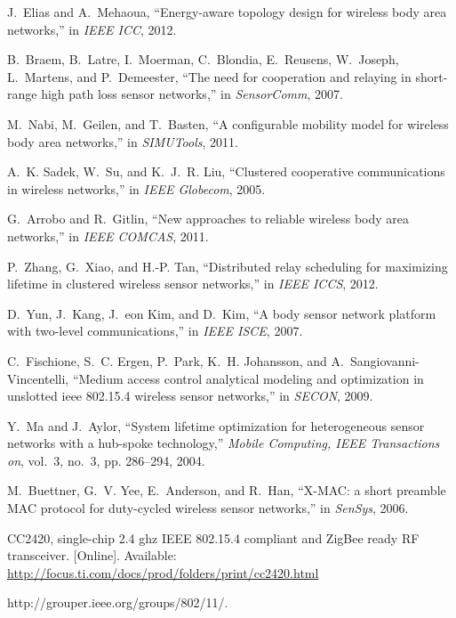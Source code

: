 \documentclass[10pt]{IEEEtran}
\begin{document}
\begin{thebibliography}{10}
J.~Elias and A.~Mehaoua, ``Energy-aware topology design for wireless body area
  networks,'' in \emph{IEEE ICC}, 2012.

B.~Braem, B.~Latre, I.~Moerman, C.~Blondia, E.~Reusens, W.~Joseph, L.~Martens,
  and P.~Demeester, ``The need for cooperation and relaying in short-range high
  path loss sensor networks,'' in \emph{SensorComm}, 2007.

M.~Nabi, M.~Geilen, and T.~Basten, ``A configurable mobility model for wireless
  body area networks,'' in \emph{SIMUTools}, 2011.

A.~K. Sadek, W.~Su, and K.~J.~R. Liu, ``Clustered cooperative communications in
  wireless networks,'' in \emph{IEEE Globecom}, 2005.

G.~Arrobo and R.~Gitlin, ``New approaches to reliable wireless body area
  networks,'' in \emph{IEEE COMCAS}, 2011.

P.~Zhang, G.~Xiao, and H.-P. Tan, ``Distributed relay scheduling for maximizing
  lifetime in clustered wireless sensor networks,'' in \emph{IEEE ICCS}, 2012.

D.~Yun, J.~Kang, J.~eon Kim, and D.~Kim, ``A body sensor network platform with
  two-level communications,'' in \emph{IEEE ISCE}, 2007.

C.~Fischione, S.~C. Ergen, P.~Park, K.~H. Johansson, and
  A.~Sangiovanni-Vincentelli, ``Medium access control analytical modeling and
  optimization in unslotted ieee 802.15.4 wireless sensor networks,'' in
  \emph{SECON}, 2009.

Y.~Ma and J.~Aylor, ``System lifetime optimization for heterogeneous sensor
  networks with a hub-spoke technology,'' \emph{Mobile Computing, IEEE
  Transactions on}, vol.~3, no.~3, pp. 286--294, 2004.

M.~Buettner, G.~V. Yee, E.~Anderson, and R.~Han, ``{X-MAC}: a short preamble
  {MAC} protocol for duty-cycled wireless sensor networks,'' in \emph{SenSys},
  2006.

\BIBentryALTinterwordspacing
{CC2420}, single-chip 2.4 ghz {IEEE} 802.15.4 compliant and {ZigBee} ready {RF}
  transceiver. [Online]. Available:
  \url{http://focus.ti.com/docs/prod/folders/print/cc2420.html}
\BIBentrySTDinterwordspacing

http://grouper.ieee.org/groups/802/11/.


\end{thebibliography}
\end{document}
